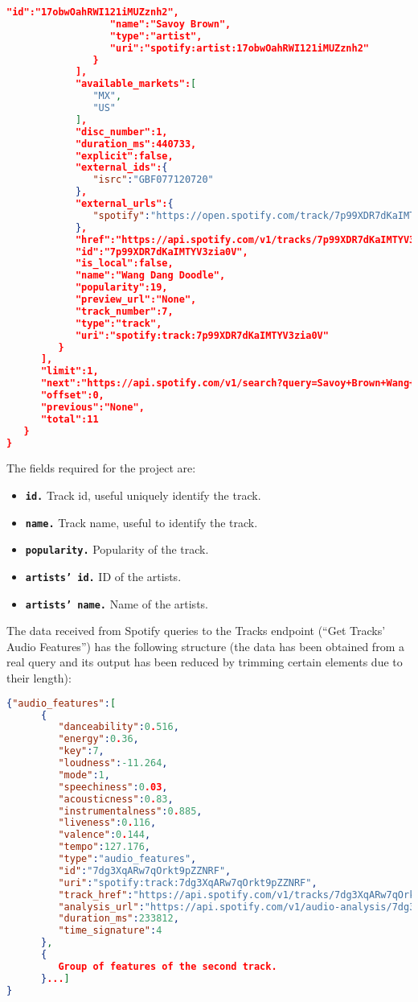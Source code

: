 \begin{lstlisting}[language=json,firstnumber=1]
                  "id":"17obwOahRWI121iMUZznh2",
                  "name":"Savoy Brown",
                  "type":"artist",
                  "uri":"spotify:artist:17obwOahRWI121iMUZznh2"
               }
            ],
            "available_markets":[
               "MX",
               "US"
            ],
            "disc_number":1,
            "duration_ms":440733,
            "explicit":false,
            "external_ids":{
               "isrc":"GBF077120720"
            },
            "external_urls":{
               "spotify":"https://open.spotify.com/track/7p99XDR7dKaIMTYV3zia0V"
            },
            "href":"https://api.spotify.com/v1/tracks/7p99XDR7dKaIMTYV3zia0V",
            "id":"7p99XDR7dKaIMTYV3zia0V",
            "is_local":false,
            "name":"Wang Dang Doodle",
            "popularity":19,
            "preview_url":"None",
            "track_number":7,
            "type":"track",
            "uri":"spotify:track:7p99XDR7dKaIMTYV3zia0V"
         }
      ],
      "limit":1,
      "next":"https://api.spotify.com/v1/search?query=Savoy+Brown+Wang+Dang+Doodle+&type=track&offset=1&limit=1",
      "offset":0,
      "previous":"None",
      "total":11
   }
}
\end{lstlisting}

\nonzeroparskip The fields required for the project are:
\begin{itemize}
	\item \textbf{\texttt{id.}} Track id, useful uniquely identify the track.
	\item \textbf{\texttt{name.}} Track name, useful to identify the track.
	\item \textbf{\texttt{popularity.}} Popularity of the track.
	\item \textbf{\texttt{artists' id.}} ID of the artists.
	\item \textbf{\texttt{artists' name.}} Name of the artists.
\end{itemize}

\nonzeroparskip The data received from Spotify queries to the Tracks endpoint (``Get Tracks' Audio Features'') has the following structure (the data has been obtained from a real query and its output has been reduced by trimming certain elements due to their length):
\begin{lstlisting}[language=json,firstnumber=1]
{"audio_features":[
      {
         "danceability":0.516,
         "energy":0.36,
         "key":7,
         "loudness":-11.264,
         "mode":1,
         "speechiness":0.03,
         "acousticness":0.83,
         "instrumentalness":0.885,
         "liveness":0.116,
         "valence":0.144,
         "tempo":127.176,
         "type":"audio_features",
         "id":"7dg3XqARw7qOrkt9pZZNRF",
         "uri":"spotify:track:7dg3XqARw7qOrkt9pZZNRF",
         "track_href":"https://api.spotify.com/v1/tracks/7dg3XqARw7qOrkt9pZZNRF",
         "analysis_url":"https://api.spotify.com/v1/audio-analysis/7dg3XqARw7qOrkt9pZZNRF",
         "duration_ms":233812,
         "time_signature":4
      },
      {
         Group of features of the second track.
      }...]
}
\end{lstlisting}

